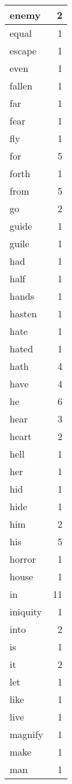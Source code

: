 \begin{center}
\begin{longtable}{l|r}
enemy & 2 \\ \hline
equal & 1 \\ \hline
escape & 1 \\ \hline
even & 1 \\ \hline
fallen & 1 \\ \hline
far & 1 \\ \hline
fear & 1 \\ \hline
fly & 1 \\ \hline
for & 5 \\ \hline
forth & 1 \\ \hline
from & 5 \\ \hline
go & 2 \\ \hline
guide & 1 \\ \hline
guile & 1 \\ \hline
had & 1 \\ \hline
half & 1 \\ \hline
hands & 1 \\ \hline
hasten & 1 \\ \hline
hate & 1 \\ \hline
hated & 1 \\ \hline
hath & 4 \\ \hline
have & 4 \\ \hline
he & 6 \\ \hline
hear & 3 \\ \hline
heart & 2 \\ \hline
hell & 1 \\ \hline
her & 1 \\ \hline
hid & 1 \\ \hline
hide & 1 \\ \hline
him & 2 \\ \hline
his & 5 \\ \hline
horror & 1 \\ \hline
house & 1 \\ \hline
in & 11 \\ \hline
iniquity & 1 \\ \hline
into & 2 \\ \hline
is & 1 \\ \hline
it & 2 \\ \hline
let & 1 \\ \hline
like & 1 \\ \hline
live & 1 \\ \hline
magnify & 1 \\ \hline
make & 1 \\ \hline
man & 1 \\ \hline

\end{longtable}
\end{center}
